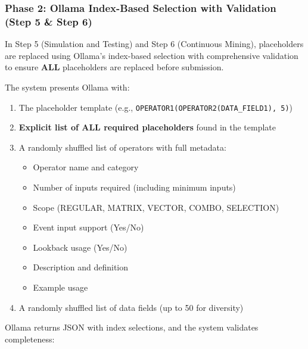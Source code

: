 \subsubsection{Phase 2: Ollama Index-Based Selection with Validation (Step 5 \& Step 6)}

In Step 5 (Simulation and Testing) and Step 6 (Continuous Mining), placeholders are replaced using Ollama's index-based selection with comprehensive validation to ensure \textbf{ALL} placeholders are replaced before submission.

The system presents Ollama with:

\begin{enumerate}
    \item The placeholder template (e.g., \texttt{OPERATOR1(OPERATOR2(DATA\_FIELD1), 5)})
    \item \textbf{Explicit list of ALL required placeholders} found in the template
    \item A randomly shuffled list of operators with full metadata:
    \begin{itemize}
        \item Operator name and category
        \item Number of inputs required (including minimum inputs)
        \item Scope (REGULAR, MATRIX, VECTOR, COMBO, SELECTION)
        \item Event input support (Yes/No)
        \item Lookback usage (Yes/No)
        \item Description and definition
        \item Example usage
    \end{itemize}
    \item A randomly shuffled list of data fields (up to 50 for diversity)
\end{enumerate}

Ollama returns JSON with index selections, and the system validates completeness:

